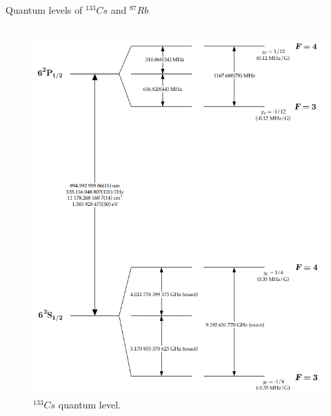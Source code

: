 \begin{frame}{Quantum levels of $^{133}Cs$ and $^{87}Rb$}
\begin{columns}[c, onlytextwidth]
\begin{column}{0.5\textwidth}
            \begin{figure}
                \centering
                \includegraphics[height=0.7\textheight]{img/levels-Caesium.png}
                \caption{$^{133}Cs$ quantum level.}
            \end{figure}

        \end{column}

    \end{columns}

\end{frame}



